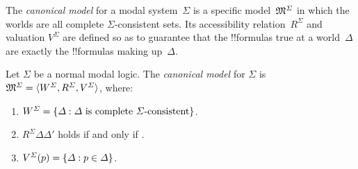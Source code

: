 \documentclass[../../../include/open-logic-section]{subfiles}
\begin{document}


The \emph{canonical model} for a modal system~$\Sigma$ is a specific
model~$\mModel{M^\Sigma}$ in which the worlds are all complete
$\Sigma$-consistent sets. Its accessibility relation~$R^\Sigma$ and
valuation $V^\Sigma$ are defined so as to guarantee that the
!!{formula}s true at a world~$\Delta$ are exactly the !!{formula}s
making up~$\Delta$.

\begin{defn}
  Let $\Sigma$ be a normal modal logic. The \emph{canonical model} for
  $\Sigma$ is $\mModel{M}^\Sigma = \tuple{W^\Sigma, R^\Sigma,
    V^\Sigma}$, where:
  \begin{enumerate}
  \item $W^\Sigma = \{  \Delta  : \Delta \text{
      is complete $\Sigma$-consistent}  \}$.
  \item $R^\Sigma \Delta\Delta'$ holds if and only if
    .
  \item $V^\Sigma(p) = \{ \Delta : p \in \Delta \}$.
  \end{enumerate}
\end{defn}
\end{document}
